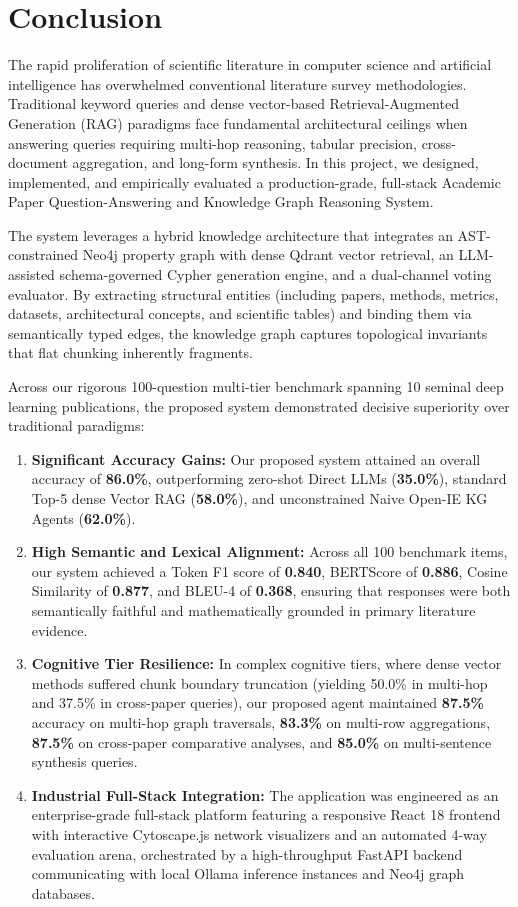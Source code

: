 \documentclass[12pt,a4paper,oneside]{report}
\begin{document}
\section{Conclusion}
\label{sec:conclusion_summary}
The rapid proliferation of scientific literature in computer science and artificial intelligence has overwhelmed conventional literature survey methodologies. Traditional keyword queries and dense vector-based Retrieval-Augmented Generation (RAG) paradigms face fundamental architectural ceilings when answering queries requiring multi-hop reasoning, tabular precision, cross-document aggregation, and long-form synthesis. In this project, we designed, implemented, and empirically evaluated a production-grade, full-stack Academic Paper Question-Answering and Knowledge Graph Reasoning System. 

The system leverages a hybrid knowledge architecture that integrates an AST-constrained Neo4j property graph with dense Qdrant vector retrieval, an LLM-assisted schema-governed Cypher generation engine, and a dual-channel voting evaluator. By extracting structural entities (including papers, methods, metrics, datasets, architectural concepts, and scientific tables) and binding them via semantically typed edges, the knowledge graph captures topological invariants that flat chunking inherently fragments. 

Across our rigorous 100-question multi-tier benchmark spanning 10 seminal deep learning publications, the proposed system demonstrated decisive superiority over traditional paradigms:
\begin{enumerate}
    \item \textbf{Significant Accuracy Gains:} Our proposed system attained an overall accuracy of \textbf{86.0\%}, outperforming zero-shot Direct LLMs (\textbf{35.0\%}), standard Top-5 dense Vector RAG (\textbf{58.0\%}), and unconstrained Naive Open-IE KG Agents (\textbf{62.0\%}).
    \item \textbf{High Semantic and Lexical Alignment:} Across all 100 benchmark items, our system achieved a Token F1 score of \textbf{0.840}, BERTScore of \textbf{0.886}, Cosine Similarity of \textbf{0.877}, and BLEU-4 of \textbf{0.368}, ensuring that responses were both semantically faithful and mathematically grounded in primary literature evidence.
    \item \textbf{Cognitive Tier Resilience:} In complex cognitive tiers, where dense vector methods suffered chunk boundary truncation (yielding 50.0\% in multi-hop and 37.5\% in cross-paper queries), our proposed agent maintained \textbf{87.5\%} accuracy on multi-hop graph traversals, \textbf{83.3\%} on multi-row aggregations, \textbf{87.5\%} on cross-paper comparative analyses, and \textbf{85.0\%} on multi-sentence synthesis queries.
    \item \textbf{Industrial Full-Stack Integration:} The application was engineered as an enterprise-grade full-stack platform featuring a responsive React 18 frontend with interactive Cytoscape.js network visualizers and an automated 4-way evaluation arena, orchestrated by a high-throughput FastAPI backend communicating with local Ollama inference instances and Neo4j graph databases.
\end{enumerate}
\end{document}
